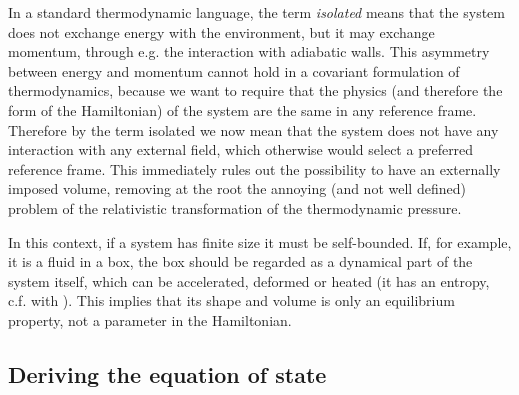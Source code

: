 \documentclass[twocolumn,usenatbib]{mnras2}
\begin{document}
In a standard thermodynamic language, the term \textit{isolated} means that the system does not exchange energy with the environment, but it may exchange momentum, through e.g. the interaction with adiabatic walls. This asymmetry between energy and momentum cannot hold in a covariant formulation of thermodynamics, because we want to require that the physics (and therefore the form of the Hamiltonian) of the system are the same in any reference frame. Therefore by the term isolated we now mean that the system does not have any interaction with any external field, which otherwise would select a preferred reference frame. This immediately rules out the possibility to have an externally imposed volume, removing at the root the annoying (and not well defined) problem of the relativistic transformation of the thermodynamic pressure. %

In this context, if a system has finite size it must be self-bounded. If, for example, it is a fluid in a box, the box should be regarded as a dynamical part of the system itself, which can be accelerated, deformed or heated (it has an entropy, c.f. with \citealt{landau5}). This implies that its shape and volume is only an equilibrium property, not a parameter in the Hamiltonian.










\subsection{Deriving the equation of state}

\end{document}

